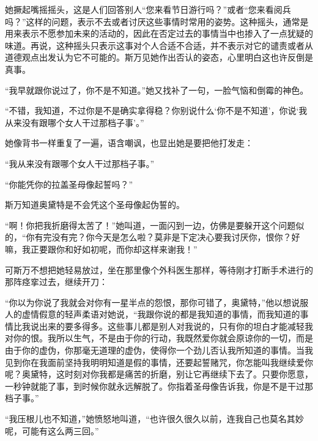 \par 她撅起嘴摇摇头，这是人们回答别人“您来看节日游行吗？”或者“您来看阅兵吗？”这样的问题，表示不去或者讨厌这些事情时常用的姿势。这种摇头，通常是用来表示不愿参加未来的活动的，因此在否定过去的事情当中也掺入了一点犹疑的味道。再说，这种摇头只表示这事对个人合适不合适，并不表示对它的谴责或者从道德观点出发认为它不可能的。斯万见她作出否认的姿态，心里明白这也许反倒是真事。
\par “我早就跟你说过了，你不是不知道。”她又找补了一句，一脸气恼和倒霉的神色。
\par “不错，我知道，不过你是不是确实拿得稳？你别说什么‘你不是不知道’，你说‘我从来没有跟哪个女人干过那档子事’。”
\par 她像背书一样重复了一遍，语含嘲讽，也显出她是要把他打发走：
\par “我从来没有跟哪个女人干过那档子事。”
\par “你能凭你的拉盖圣母像起誓吗？”
\par 斯万知道奥黛特是不会凭这个圣母像起伪誓的。
\par “啊！你把我折磨得太苦了！”她叫道，一面闪到一边，仿佛是要躲开这个问题似的，“你有完没有完？你今天是怎么啦？莫非是下定决心要我讨厌你，恨你？好嘛，我正要跟你和好如初呢，而你却这样来谢我！”
\par 可斯万不想把她轻易放过，坐在那里像个外科医生那样，等待刚才打断手术进行的那阵痉挛过去，继续开刀：
\par “你以为你说了我就会对你有一星半点的怨恨，那你可错了，奥黛特，”他以想说服人的虚情假意的轻声柔语对她说，“我跟你说的都是我知道的事情，而我知道的事情比我说出来的要多得多。这些事儿都是别人对我说的，只有你的坦白才能减轻我对你的恨。我所以生气，不是由于你的行动，我既然爱你就会原谅你的一切，而是由于你的虚伪，你那毫无道理的虚伪，使得你一个劲儿否认我所知道的事情。当我见到你在我面前坚持我明明知道是假的事情，还要起誓赌咒，你怎能叫我继续爱你呢？奥黛特，这时刻对你我都是痛苦的折磨，别让它再继续下去了。只要你愿意，一秒钟就能了事，到时候你就永远解脱了。你指着圣母像告诉我，你是不是干过那档子事。”
\par “我压根儿也不知道，”她愤怒地叫道，“也许很久很久以前，连我自己也莫名其妙呢，可能有这么两三回。”
